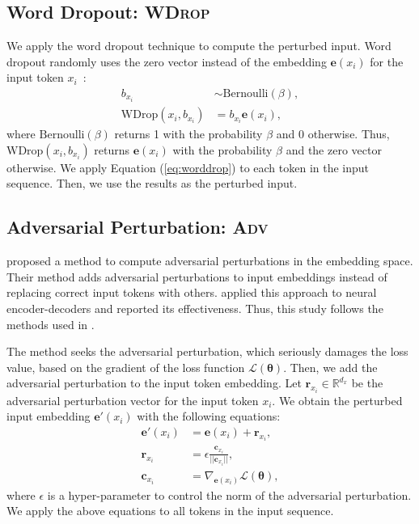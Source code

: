 \documentclass[11pt]{article}
\newcommand{\worddrop}{\textsc{WDrop}}
\newcommand{\adv}{\textsc{Adv}}
\begin{document}
\subsection{Word Dropout: \worddrop{}}
We apply the word dropout technique to compute the perturbed input.
Word dropout randomly uses the zero vector instead of the embedding $\bm{e}(x_i)$ for the input token $x_i$~\cite{NIPS2016_6241}:
\begin{align}
 b_{x_i} &\sim \mathrm{Bernoulli}(\beta) , \\
 \mathrm{WDrop}(x_i, b_{x_i}) &= b_{x_i} \bm{e}(x_i) \label{eq:worddrop},
\end{align}
where $\mathrm{Bernoulli}(\beta)$ returns 1 with the probability $\beta$ and 0 otherwise.
Thus, $\mathrm{WDrop}(x_i, b_{x_i})$ returns $\bm{e}(x_i)$ with the probability $\beta$ and the zero vector otherwise.
We apply Equation (\ref{eq:worddrop}) to each token in the input sequence.
Then, we use the results as the perturbed input.


\subsection{Adversarial Perturbation: \adv{}}
 proposed a method to compute adversarial perturbations in the embedding space.
Their method adds adversarial perturbations to input embeddings instead of replacing correct input tokens with others.
 applied this approach to neural encoder-decoders and reported its effectiveness.
Thus, this study follows the methods used in .


The method seeks the adversarial perturbation, which seriously damages the loss value, based on the gradient of the loss function $\mathcal{L}(\bm{\theta})$.
Then, we add the adversarial perturbation to the input token embedding.
Let $\bm{r}_{x_i} \in \mathbb{R}^{d_x}$ be the adversarial perturbation vector for the input token $x_i$.
We obtain the perturbed input embedding $\bm{e}'(x_i)$ with the following equations:
\begin{align}
 \bm{e}'(x_i) &= \bm{e}(x_i) + \bm{r}_{x_i}, \\
 \bm{r}_{x_i} &= \epsilon \frac{ \bm{c}_{x_i} }{ ||\bm{c}_{x_i}|| }, \\
 \bm{c}_{x_i} &= \nabla_{\bm{e}({x_i})}\mathcal{L}(\bm{\theta}),
\end{align}
where $\epsilon$ is a hyper-parameter to control the norm of the adversarial perturbation.
We apply the above equations to all tokens in the input sequence.
\end{document}
